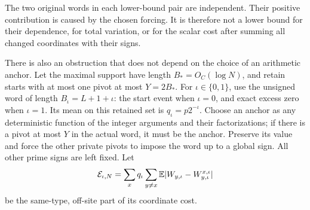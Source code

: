 The two original words in each lower-bound pair are
independent.  Their positive contribution is caused by
the chosen forcing.  It is therefore not a lower bound
for their dependence, for total variation, or for the
scalar cost after summing all changed coordinates with
their signs.

There is also an obstruction that does not depend on the
choice of an arithmetic anchor.  Let the maximal support
have length $B_*=O_C(\log N)$, and retain starts with at
most one pivot at most $Y=2B_*$.  For $\iota\in\{0,1\}$,
use the unsigned word of length $B_\iota=L+1+\iota$:
the start event when $\iota=0$, and exact excess zero
when $\iota=1$.  Its mean on this retained set is
$q_\iota=p2^{-\iota}$.  Choose an anchor as any deterministic
function of the integer arguments and their factorizations;
if there is a pivot at most $Y$ in the actual word, it must
be the anchor.  Preserve its value and force the other
private pivots to impose the word up to a global sign.
All other prime signs are left fixed.  Let
\[
 \mathcal E_{\iota,N}
 =\sum_xq_\iota\sum_{y\ne x}
       \mathbb E|W_{y,\iota}-W^{x,\iota}_{y,\iota}|
\]
be the same-type, off-site part of its coordinate cost.

